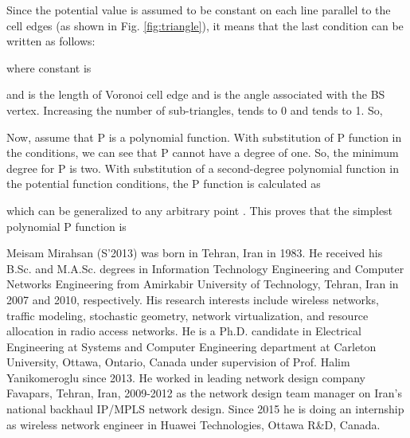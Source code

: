 \documentclass[journal]{IEEEtran}
\begin{document}
Since the potential value is assumed to be constant on each line parallel to the cell edges (as shown in Fig. \ref{fig:triangle}), it means that the last condition can be written as follows:

where constant  is

and  is the length of Voronoi cell edge and  is the angle associated with the BS vertex. Increasing the number of sub-triangles,  tends to 0 and  tends to 1. So,


Now, assume that P is a polynomial function. With substitution of P function in the conditions, we can see that P cannot have a degree of one. So, the minimum degree for P is two. With substitution of a second-degree polynomial function in the potential function conditions, the P function is calculated as

which can be generalized to any arbitrary point . This proves that the simplest polynomial P function is





\begin{IEEEbiography}{Meisam Mirahsan}
(S'2013) was born in Tehran, Iran in 1983. He received his B.Sc. and M.A.Sc. degrees in Information Technology Engineering and Computer Networks Engineering from Amirkabir University of Technology, Tehran, Iran in 2007 and 2010, respectively.
His research interests include wireless networks, traffic modeling, stochastic geometry, network virtualization, and resource allocation in radio access networks.
He is a Ph.D. candidate in Electrical Engineering at Systems and Computer Engineering department at Carleton University, Ottawa, Ontario, Canada under supervision of Prof. Halim Yanikomeroglu since 2013.
He worked in leading network design company Favapars, Tehran, Iran, 2009-2012 as the network design team manager on Iran's national backhaul IP/MPLS network design.
Since 2015 he is doing an internship as wireless network engineer in Huawei Technologies, Ottawa R\&D, Canada.
\end{IEEEbiography}
\end{document}
